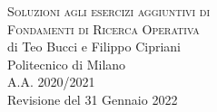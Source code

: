 \documentclass[10pt,a4paper,twoside,openright]{book}
\newcounter{es}
\numberwithin{es}{chapter}
\begin{document}

\frontmatter
\pagestyle{empty} %
\vspace*{\fill}
\begin{center}
	{\large \textsc{Soluzioni agli esercizi aggiuntivi di}}\\
	\vspace*{0.4cm}
	{\Huge \textsc{Fondamenti di Ricerca Operativa}}\\
	\vspace*{1cm}
	{\large {di Teo Bucci e Filippo Cipriani}}\\
	\vspace*{1cm}
	Politecnico di Milano\\A.A. 2020/2021\\
	\vspace*{1cm}
	Revisione del 31 Gennaio 2022
\end{center}
\vspace*{\fill}
\newpage


%
%
%
%
%



\newpage


\tableofcontents


\end{document}
